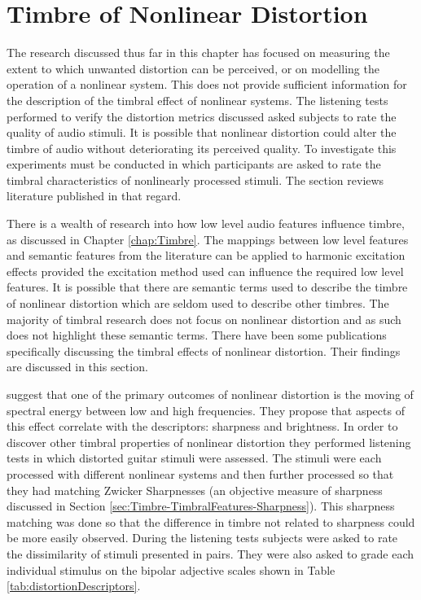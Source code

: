 \section{Timbre of Nonlinear Distortion}
\label{sec:Excitation-Timbre}
	The research discussed thus far in this chapter has focused on measuring the extent to which unwanted distortion
	can be perceived, or on modelling the operation of a nonlinear system. This does not provide sufficient information
	for the description of the timbral effect of nonlinear systems. The listening tests performed to verify the
	distortion metrics discussed asked subjects to rate the quality of audio stimuli. It is possible that nonlinear
	distortion could alter the timbre of audio without deteriorating its perceived quality. To investigate this
	experiments must be conducted in which participants are asked to rate the timbral characteristics of nonlinearly
	processed stimuli. The section reviews literature published in that regard.

	There is a wealth of research into how low level audio features influence timbre, as discussed in Chapter
	\ref{chap:Timbre}. The mappings between low level features and semantic features from the literature can be applied
	to harmonic excitation effects provided the excitation method used can influence the required low level features.
	It is possible that there are semantic terms used to describe the timbre of nonlinear distortion which are seldom
	used to describe other timbres. The majority of timbral research does not focus on nonlinear distortion and as such
	does not highlight these semantic terms. There have been some publications specifically discussing the timbral
	effects of nonlinear distortion. Their findings are discussed in this section.

	\citet{marui2005predicting} suggest that one of the primary outcomes of nonlinear distortion is the moving of
	spectral energy between low and high frequencies. They propose that aspects of this effect correlate with the
	descriptors: sharpness and brightness. In order to discover other timbral properties of nonlinear distortion they
	performed listening tests in which distorted guitar stimuli were assessed. The stimuli were each processed with
	different nonlinear systems and then further processed so that they had matching Zwicker Sharpnesses (an objective
	measure of sharpness \citep{fastl2007psychoacoustics} discussed in Section
	\ref{sec:Timbre-TimbralFeatures-Sharpness}). This sharpness matching was done so that the difference in timbre not
	related to sharpness could be more easily observed. During the listening tests subjects were asked to rate the
	dissimilarity of stimuli presented in pairs. They were also asked to grade each individual stimulus on the bipolar
	adjective scales shown in Table \ref{tab:distortionDescriptors}.

